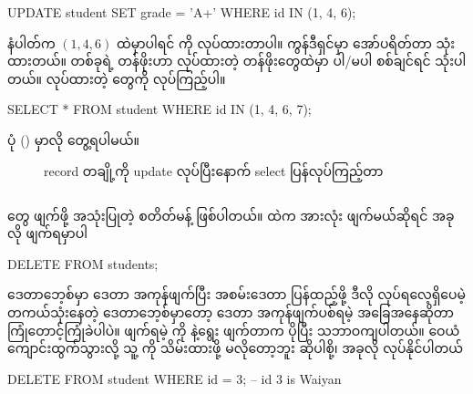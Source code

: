 %
\begin{sql}
UPDATE student SET grade = 'A+' WHERE id IN (1, 4, 6);
\end{sql}
%
 နံပါတ်က $(1,4,6)$ ထဲမှာပါရင်  ကို   လုပ်ထားတာပါ။  ကွန်ဒီရှင်မှာ   အော်ပရိတ်တာ သုံးထားတယ်။  တစ်ခုရဲ့ တန်ဖိုးဟာ  လုပ်ထားတဲ့ တန်ဖိုးတွေထဲမှာ ပါ/မပါ စစ်ချင်ရင်  သုံးပါတယ်။  လုပ်ထားတဲ့  တွေကို  လုပ်ကြည့်ပါ။ 
%
\begin{sql}
SELECT * FROM student WHERE id IN (1, 4, 6, 7);
\end{sql}
%
ပုံ (\fRefNo{\ref{fig:afterupdate}}) မှာလို တွေ့ရပါမယ်။

\begin{figure}[tbh!]
\caption{record တချို့ကို update လုပ်ပြီးနောက် select ပြန်လုပ်ကြည့်တာ} 
\label{fig:afterupdate}
\end{figure}

\subsection*{}
 တွေ ဖျက်ဖို့ အသုံးပြုတဲ့ စတိတ်မန့် ဖြစ်ပါတယ်။  ထဲက  အားလုံး ဖျက်မယ်ဆိုရင် အခုလို ဖျက်ရမှာပါ
%
\begin{sql}
DELETE FROM students;
\end{sql}
%
 ဒေတာဘေ့စ်မှာ  ဒေတာ အကုန်ဖျက်ပြီး အစမ်းဒေတာ  ပြန်ထည့်ဖို့ ဒီလို လုပ်ရလေ့ရှိပေမဲ့ တကယ်သုံးနေတဲ့  ဒေတာဘေ့စ်မှာတော့  ဒေတာ အကုန်ဖျက်ပစ်ရမဲ့ အခြေအနေဆိုတာ ကြုံတောင့်ကြုံခဲပါပဲ။ ဖျက်ရမဲ့  ကို  နဲ့ရွေး ဖျက်တာက ပိုပြီး သဘာဝကျပါတယ်။ ဝေယံ ကျောင်းထွက်သွားလို့ သူ့  ကို သိမ်းထားဖို့ မလိုတော့ဘူး ဆိုပါစို့၊ အခုလို  လုပ်နိုင်ပါတယ် 
%
\begin{sql}
DELETE FROM student WHERE id = 3; -- id 3 is Waiyan
\end{sql}
%


